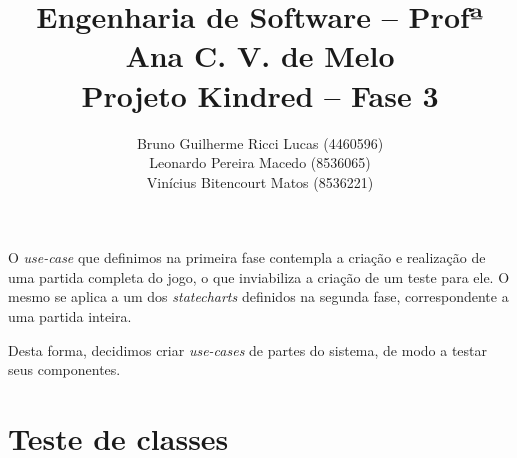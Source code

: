 \documentclass{article}
\title{
    Engenharia de Software -- Profª Ana C. V. de Melo\\
    Projeto Kindred -- Fase 3
}
\author{
    Bruno Guilherme Ricci Lucas (4460596)\\
    Leonardo Pereira Macedo (8536065)\\
    Vinícius Bitencourt Matos (8536221)
}
\begin{document}
\maketitle

O \emph{use-case} que definimos na primeira fase contempla a criação e realização de
uma partida completa do jogo, o que inviabiliza a criação de um teste para ele. O
mesmo se aplica a um dos \emph{statecharts} definidos na segunda fase, correspondente
a uma partida inteira.

Desta forma, decidimos criar \emph{use-cases} de partes do sistema, de modo a testar
seus componentes.


\section{Teste de classes}




\end{document}
